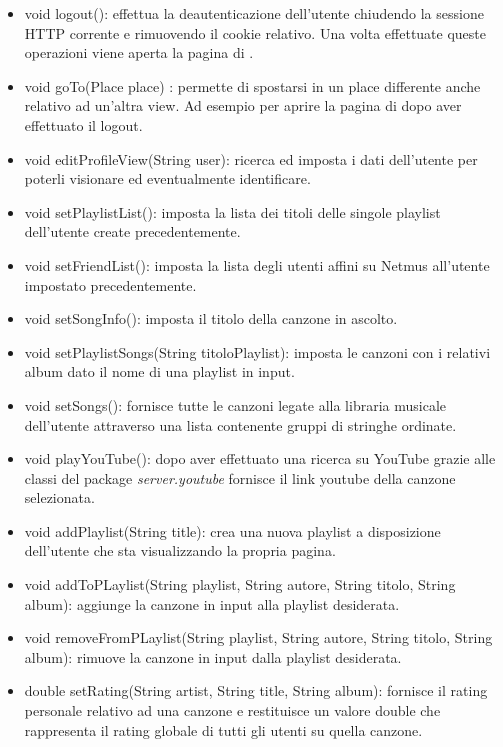 \begin{itemize}
    \item void logout(): effettua la deautenticazione dell'utente chiudendo la
    sessione HTTP corrente e rimuovendo il cookie relativo. Una volta effettuate
    queste operazioni viene aperta la pagina di .
    \item void goTo(Place place) : permette di spostarsi in un place differente
    anche relativo ad un'altra view. Ad esempio per aprire la pagina di
     dopo aver effettuato il logout.
    \item void editProfileView(String user): ricerca ed imposta i dati 
    dell'utente per poterli visionare ed eventualmente identificare.
    \item void setPlaylistList(): imposta la lista dei
    titoli delle singole playlist dell'utente create precedentemente.
    \item void setFriendList(): imposta la lista degli
    utenti affini su Netmus all'utente impostato precedentemente.
    \item void setSongInfo(): imposta il titolo della canzone in
    ascolto.
    \item void setPlaylistSongs(String titoloPlaylist): imposta le canzoni
    con i relativi album dato il nome di una playlist in input.
    \item void setSongs(): fornisce tutte le canzoni legate alla libraria
    musicale dell'utente attraverso una lista contenente gruppi di stringhe
    ordinate.
    \item void playYouTube(): dopo aver effettuato una ricerca su YouTube grazie
    alle classi del package \emph{server.youtube} fornisce il link youtube della
    canzone selezionata.
    \item void addPlaylist(String title): crea una nuova playlist a
    disposizione dell'utente che sta visualizzando la propria pagina.
    \item void addToPLaylist(String playlist, String autore, String titolo,
    String album): aggiunge la canzone in input alla playlist desiderata.
    \item void removeFromPLaylist(String playlist, String autore, String titolo,
    String album): rimuove la canzone in input dalla playlist desiderata.
    \item double setRating(String artist, String title, String album): fornisce
    il rating personale relativo ad una canzone e restituisce un valore double
    che rappresenta il rating globale di tutti gli utenti su quella canzone.

\end{itemize}
